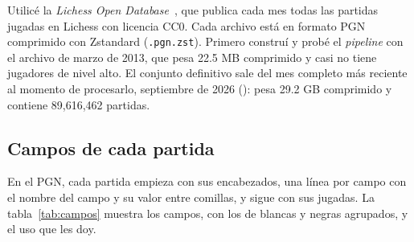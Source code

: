 \documentclass[a4paper,12pt,twocolumn]{article}
\begin{document}
Utilicé la \textit{Lichess Open Database}~\cite{lichessDatabase}, que publica cada mes todas las partidas jugadas en Lichess con licencia CC0. Cada archivo está en formato PGN comprimido con Zstandard (\texttt{.pgn.zst}).
\newline
Primero construí y probé el \textit{pipeline} con el archivo de marzo de 2013, que pesa 22.5 MB comprimido y casi no tiene jugadores de nivel alto. El conjunto definitivo sale del mes completo más reciente al momento de procesarlo, septiembre de 2026 (): pesa 29.2 GB comprimido y contiene 89,616,462 partidas.

\subsection{Campos de cada partida}

En el PGN, cada partida empieza con sus encabezados, una línea por campo con el nombre del campo y su valor entre comillas, y sigue con sus jugadas. La tabla~\ref{tab:campos} muestra los campos, con los de blancas y negras agrupados, y el uso que les doy.
\end{document}
